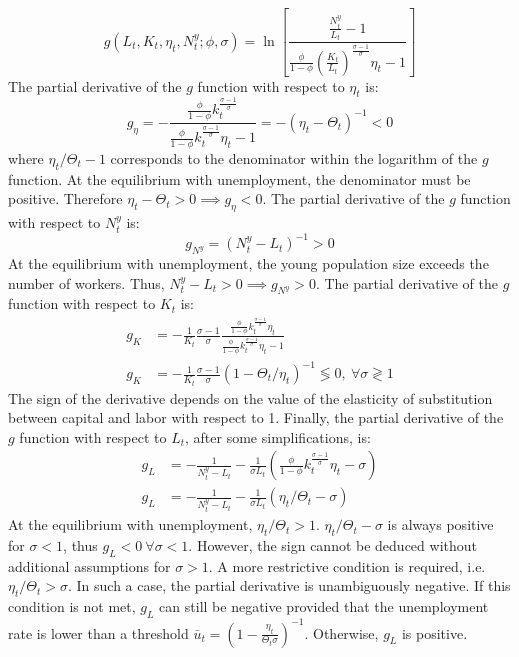 \documentclass[
]{article}
\begin{document}
\begin{equation*}
    g(L_t, K_t, \eta_t, N_t^y; \phi, \sigma) = \ln\left[ \frac{ \frac{N_t^y}{L_t} - 1 } { \frac{\phi}{1-\phi} \left(\frac{K_t}{L_t}\right)^{\frac{\sigma-1}{\sigma}} \eta_t - 1 }\right]
\end{equation*}
The partial derivative of the \(g\) function with respect to \(\eta_t\) is:
\begin{equation*}
        g_\eta = - \frac{\frac{\phi}{1-\phi}k_t^{\frac{\sigma-1}{\sigma}}}{\frac{\phi}{1-\phi}k_t^{\frac{\sigma-1}{\sigma}}\eta_t - 1} = - \left(\eta_t - \Theta_t\right)^{-1} < 0
\end{equation*}
where \(\eta_t/\Theta_t - 1\) corresponds to the denominator within the logarithm of the \(g\) function. At the equilibrium with unemployment, the denominator must be positive. Therefore \(\eta_t - \Theta_t >0 \implies g_\eta < 0\). The partial derivative of the \(g\) function with respect to \(N_t^y\) is:
\begin{equation*}
    g_{N^y} = \left(N_t^y-L_t\right)^{-1} > 0
\end{equation*}
At the equilibrium with unemployment, the young population size exceeds the number of workers. Thus, \(N_t^y-L_t > 0 \implies g_{N^y} > 0\). The partial derivative of the \(g\) function with respect to \(K_t\) is:
\begin{align*}
    g_K &= -\frac{1}{K_t}\frac{\sigma - 1}{\sigma}\frac{\frac{\phi}{1-\phi}k_t^{\frac{\sigma-1}{\sigma}}\eta_t}{\frac{\phi}{1-\phi}k_t^{\frac{\sigma-1}{\sigma}}\eta_t - 1} \\
    g_K &= -\frac{1}{K_t}\frac{\sigma - 1}{\sigma}\left(1-\Theta_t/\eta_t\right)^{-1} \lessgtr 0,~\forall \sigma \gtrless 1
\end{align*}
The sign of the derivative depends on the value of the elasticity of substitution between capital and labor with respect to 1. Finally, the partial derivative of the \(g\) function with respect to \(L_t\), after some simplifications, is:
\begin{align*}
    g_L &= -\frac{1}{N_t^y-L_t} - \frac{1}{\sigma L_t} \left(\frac{\phi}{1-\phi}k_t^{\frac{\sigma-1}{\sigma}}\eta_t - \sigma\right) \\
    g_L &= -\frac{1}{N_t^y-L_t} - \frac{1}{\sigma L_t} \left(\eta_t/\Theta_t - \sigma\right)
\end{align*}
At the equilibrium with unemployment, \(\eta_t/\Theta_t > 1\). \(\eta_t/\Theta_t -\sigma\) is always positive for \(\sigma < 1\), thus \(g_L < 0~\forall \sigma < 1\). However, the sign cannot be deduced without additional assumptions for \(\sigma > 1\). A more restrictive condition is required, i.e.~\(\eta_t/\Theta_t > \sigma\). In such a case, the partial derivative is unambiguously negative. If this condition is not met, \(g_L\) can still be negative provided that the unemployment rate is lower than a threshold \(\bar{u}_t = \left(1 - \frac{\eta_t}{\Theta_t \sigma}\right)^{-1}\). Otherwise, \(g_L\) is positive.
\end{document}
